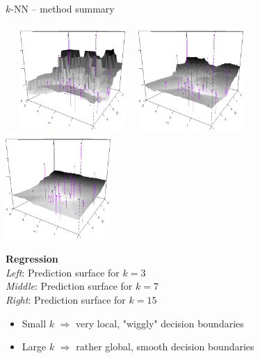 \begin{frame}{$k$-NN -- method summary}
\begin{minipage}{0.7\textwidth}
\, \, \, \includegraphics[width=0.3\textwidth]{figure/knn-reg-3d-3.png} \, \,
\includegraphics[width=0.3\textwidth]{figure/knn-reg-3d-7.png} \, \,
\includegraphics[width=0.3\textwidth]{figure/knn-reg-3d-15.png}
\end{minipage}%
\hfill
\begin{minipage}{0.25\textwidth}
  \tiny
  \raggedright
  \textbf{Regression} \\
  \textit{Left}: Prediction surface for $k = 3$\\ 
  \textit{Middle}: Prediction surface for $k = 7$\\
  \textit{Right}: Prediction surface for $k = 15$
\end{minipage}

\medskip

\begin{itemize}
    \item Small $k$ $\Rightarrow$ very local, "wiggly" decision boundaries
    \item Large $k$ $\Rightarrow$ rather global, smooth decision boundaries
\end{itemize}

\end{frame}

